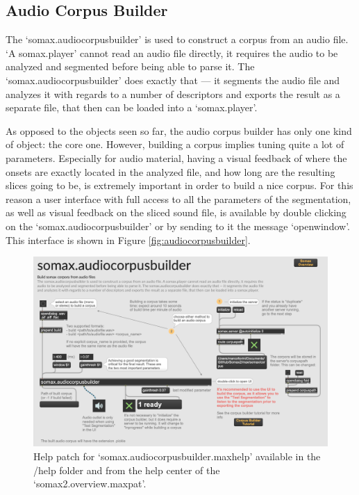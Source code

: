 \subsection{Audio Corpus Builder}

The `somax.audiocorpusbuilder' is used to construct a corpus from an audio file. `A somax.player' cannot read an audio file directly, it requires the audio to be analyzed and segmented before being able to parse it. The `somax.audiocorpusbuilder' does exactly that — it segments the audio file and analyzes it with regards to a number of descriptors and exports the result as a separate file, that then can be loaded into a `somax.player'.

As opposed to the objects seen so far, the audio corpus builder has only one kind of object: the core one. However, building a corpus implies tuning quite a lot of parameters. Especially for audio material, having a visual feedback of where the onsets are exactly located in the analyzed file, and how long are the resulting slices going to be, is extremely important in order to build a nice corpus. For this reason a user interface with full access to all the parameters of the segmentation, as well as visual feedback on the sliced sound file, is available by double clicking on the `somax.audiocorpusbuilder' or by sending to it the message `openwindow'. This interface is shown in Figure \ref{fig:audiocorpusbuilder}.

\begin{figure}[H]
    \centering        
 	\includegraphics[width=1\textwidth, keepaspectratio]{img/audiocorpusbuilder_help.png}
    \caption{Help patch for `somax.audiocorpusbuilder.maxhelp' available in the /help folder and from the help center of the `somax2.overview.maxpat'.}
    \label{fig:audiocorpusbuilder_help}
\end{figure}

